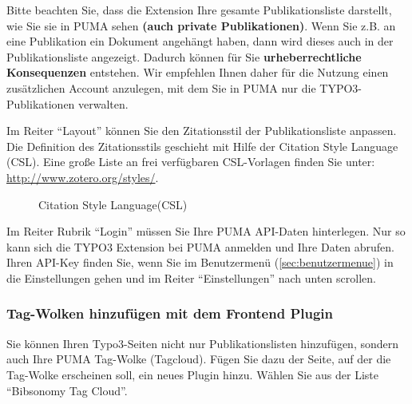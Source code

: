 \begin{mdframed}[style=mdfexample1,frametitle={ACHTUNG},backgroundcolor=gray!40]Bitte beachten Sie, dass die Extension Ihre gesamte Publi\-kations\-liste darstellt, wie Sie sie in PUMA sehen \textbf{(auch private Publikationen)}. Wenn Sie z.B. an eine Publikation ein Dokument angehängt haben, dann wird dieses auch in der Publikationsliste angezeigt. Dadurch können für Sie \textbf{urheberrechtliche Konsequenzen} entstehen. Wir empfehlen Ihnen daher für die Nutzung einen zusätzlichen Account anzulegen, mit dem Sie in PUMA nur die TYPO3-Publikationen verwalten.
\end{mdframed} 
Im Reiter \enquote{Layout} können Sie den Zitationsstil der Publikationsliste anpassen. Die Definition des Zitationsstils geschieht mit Hilfe der Citation Style Language (CSL). Eine große Liste an frei verfügbaren CSL-Vorlagen finden Sie unter: \url{http://www.zotero.org/styles/}.
\begin{figure}[h!]
 \centering
 \caption{Citation Style Language(CSL)}
 \label{fig:csl}
\end{figure}

Im Reiter Rubrik \enquote{Login} müssen Sie Ihre PUMA
API-Daten hinterlegen. Nur so kann sich die TYPO3 Extension
bei PUMA anmelden und Ihre Daten abrufen. Ihren API-Key finden Sie,
wenn Sie im Benutzermenü (\autoref{sec:benutzermenue}) in die
Einstellungen gehen und im Reiter \enquote{Einstellungen} nach unten
scrollen.

\subsubsection*{Tag-Wolken hinzufügen mit dem Frontend Plugin}\label{sss:typo3Tagwolken}
Sie können Ihren Typo3-Seiten nicht nur Publikationslisten hinzufügen, sondern auch Ihre PUMA Tag-Wolke (Tagcloud). Fügen Sie dazu der Seite, auf der die Tag-Wolke erscheinen soll, ein neues Plugin hinzu. Wählen Sie aus der Liste \enquote{Bibsonomy Tag Cloud}.

